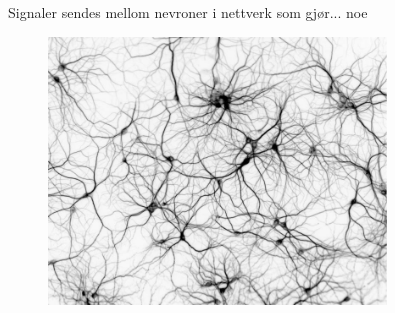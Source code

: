 \documentclass[presentation]{beamer}
\begin{document}
\begin{frame}{Signaler sendes mellom nevroner i nettverk som gjør... noe}
   \begin{figure}
       {\includegraphics[width=0.8\textwidth]{network2.jpg}}
\end{figure}
\end{frame}
\end{document}

